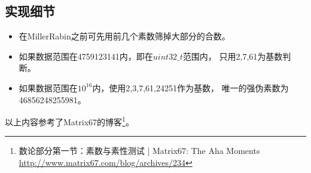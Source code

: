\subsection{实现细节}
\begin{itemize}
    \item 在MillerRabin之前可先用前几个素数筛掉大部分的合数。
    \item 如果数据范围在4759123141内，即在$uint32\_t$范围内，
    只用2,7,61为基数判断。
    \item 如果数据范围在$10^{16}$内，使用2,3,7,61,24251作为基数，
    唯一的强伪素数为46856248255981。
\end{itemize}

以上内容参考了Matrix67的博客\footnote{
	数论部分第一节：素数与素性测试 | Matrix67: The Aha Moments
	\url{http://www.matrix67.com/blog/archives/234}}。
